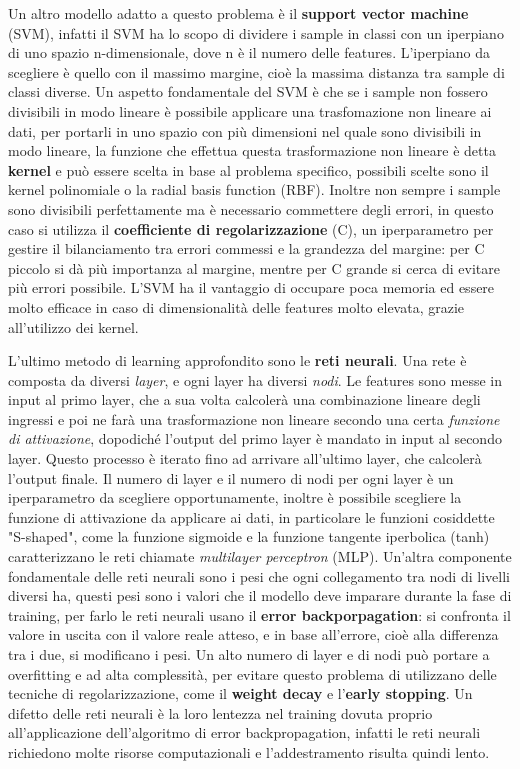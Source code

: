 Un altro modello adatto a questo problema è il \textbf{support vector machine} (SVM), infatti il SVM ha lo scopo di dividere i sample in classi con un iperpiano di uno spazio n-dimensionale, dove n è il numero delle features. L'iperpiano da scegliere è quello con il massimo margine, cioè la massima distanza tra sample di classi diverse. Un aspetto fondamentale del SVM è che se i sample non fossero divisibili in modo lineare è possibile applicare una trasfomazione non lineare ai dati, per portarli in uno spazio con più dimensioni nel quale sono divisibili in modo lineare, la funzione che effettua questa trasformazione non lineare è detta \textbf{kernel} e può essere scelta in base al problema specifico, possibili scelte sono il kernel polinomiale o la radial basis function (RBF). Inoltre non sempre i sample sono divisibili perfettamente ma è necessario commettere degli errori, in questo caso si utilizza il \textbf{coefficiente di regolarizzazione} (C), un iperparametro per gestire il bilanciamento tra errori commessi e la grandezza del margine: per C piccolo si dà più importanza al margine, mentre per C grande si cerca di evitare più errori possibile. L'SVM ha il vantaggio di occupare poca memoria ed essere molto efficace in caso di dimensionalità delle features molto elevata, grazie all'utilizzo dei kernel.

L'ultimo metodo di learning approfondito sono le \textbf{reti neurali}. Una rete è composta da diversi \textit{layer}, e ogni layer ha diversi \textit{nodi}. Le features sono messe in input al primo layer, che a sua volta calcolerà una combinazione lineare degli ingressi e poi ne farà una trasformazione non lineare secondo una certa \textit{funzione di attivazione}, dopodiché l'output del primo layer è mandato in input al secondo layer. Questo processo è iterato fino ad arrivare all'ultimo layer, che calcolerà l'output finale. Il numero di layer e il numero di nodi per ogni layer è un iperparametro da scegliere opportunamente, inoltre è possibile scegliere la funzione di attivazione da applicare ai dati, in particolare le funzioni cosiddette "S-shaped", come la funzione sigmoide e la funzione tangente iperbolica (tanh) caratterizzano le reti chiamate \textit{multilayer perceptron} (MLP).  Un'altra componente fondamentale delle reti neurali sono i pesi che ogni collegamento tra nodi di livelli diversi ha, questi pesi sono i valori che il modello deve imparare durante la fase di training, per farlo le reti neurali usano il \textbf{error backporpagation}: si confronta il valore in uscita con il valore reale atteso, e in base all'errore, cioè alla differenza tra i due, si modificano i pesi. Un alto numero di layer e di nodi può portare a overfitting e ad alta complessità, per evitare questo problema di utilizzano delle tecniche di regolarizzazione, come il \textbf{weight decay} e l'\textbf{early stopping}. Un difetto delle reti neurali è la loro lentezza nel training dovuta proprio all'applicazione dell'algoritmo di error backpropagation, infatti le reti neurali richiedono molte risorse computazionali e l'addestramento risulta quindi lento.


